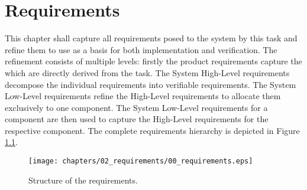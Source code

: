 \chapter{Requirements}
This chapter shall capture all requirements posed to the
system by this task and refine them to use as a basis for
both implementation and verification.
The refinement consists of multiple levels:
firstly the product requirements capture the which are directly
derived from the task. The System High-Level requirements
decompose the individual requirements into verifiable
requirements. The System Low-Level requirements refine the 
High-Level requirements to allocate them exclusively to one
component. The System Low-Level requirements for a component
are then used to capture the High-Level requirements for the respective
component. The complete requirements hierarchy is depicted
in Figure \ref{fig:reqStructure}.

\begin{figure}[H]
    \centering
    \texttt{[image: chapters/02\_requirements/00\_requirements.eps]}
    \caption{Structure of the requirements.} 
    \label{fig:reqStructure}
\end{figure}

\newpage




